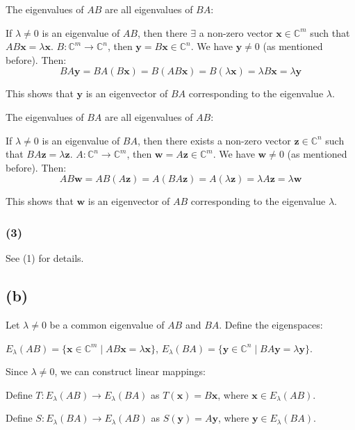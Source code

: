 \documentclass{article}
\begin{document}
The eigenvalues of $AB$ are all eigenvalues of $BA$:

If $ \lambda\neq0 $ is an eigenvalue of $ AB $, then there $\exists$ a non-zero vector $ \mathbf{x}\in\mathbb{C}^m $ such that $ AB\mathbf{x}=\lambda\mathbf{x} $. $ B:\mathbb{C}^m\to\mathbb{C}^n $, then $ \mathbf{y} = B\mathbf{x}\in\mathbb{C}^n $. We have $ \mathbf{y}\neq0 $ (as mentioned before). Then:
$$
BA\mathbf{y}=BA(B\mathbf{x})=B(AB\mathbf{x})=B(\lambda\mathbf{x})=\lambda B\mathbf{x}=\lambda\mathbf{y}
$$

This shows that $ \mathbf{y} $ is an eigenvector of $ BA $ corresponding to the eigenvalue $ \lambda $.

The eigenvalues of $BA$ are all eigenvalues of $AB$:

If $ \lambda\neq0 $ is an eigenvalue of $ BA $, then there exists a non-zero vector $ \mathbf{z}\in\mathbb{C}^n $ such that $ BA\mathbf{z}=\lambda\mathbf{z} $. $ A:\mathbb{C}^n\to\mathbb{C}^m $, then $ \mathbf{w}=A\mathbf{z}\in\mathbb{C}^m $. We have $ \mathbf{w}\neq0 $ (as mentioned before). Then:
$$
AB\mathbf{w}=AB(A\mathbf{z})=A(BA\mathbf{z})=A(\lambda\mathbf{z})=\lambda A\mathbf{z}=\lambda\mathbf{w}
$$

This shows that $ \mathbf{w} $ is an eigenvector of $ AB $ corresponding to the eigenvalue $ \lambda $.

\subsubsection*{(3)} 

See (1) for details.

\subsection*{(b)} 

Let $ \lambda\neq 0 $ be a common eigenvalue of $ AB $ and $ BA $. Define the eigenspaces:

$ E_{\lambda}(AB)=\{ \mathbf{x}\in\mathbb{C}^m\mid AB\mathbf{x}=\lambda\mathbf{x}\} $, $ E_{\lambda}(BA)=\{ \mathbf{y}\in\mathbb{C}^n\mid BA\mathbf{y}=\lambda\mathbf{y}\} $.

Since $ \lambda\neq 0 $, we can construct linear mappings:

Define $ T: E_{\lambda}(AB)\to E_{\lambda}(BA) $ as $ T(\mathbf{x}) = B\mathbf{x} $, where $ \mathbf{x}\in E_{\lambda}(AB) $.

Define $ S: E_{\lambda}(BA)\to E_{\lambda}(AB) $ as $ S(\mathbf{y}) = A\mathbf{y} $, where $ \mathbf{y}\in E_{\lambda}(BA) $.
\end{document}
